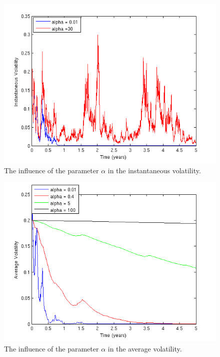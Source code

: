 \documentclass[11pt]{article}
\begin{document}
 \begin{figure}[h]
 \includegraphics{Figures/alpha_effect_sigma.png}
 \caption{The influence of the parameter $\alpha$ in the instantaneous volatility.}
\end{figure}

 \begin{figure}[h]
 \includegraphics{Figures/alpha_effect_xi.png}
 \caption{The influence of the parameter $\alpha$ in the average volatility.}
\end{figure}
\end{document}
